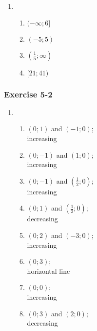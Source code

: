 {\begin{multicols}{3}
\begin{enumerate}[noitemsep, label=\textbf{\arabic*}. ]
\item %
\begin{enumerate}[noitemsep, label=\textbf{(\alph*)} ] 
 \item $(-\infty; 6]$ %
 \item $(-5; 5)$ %
 \item $(\frac{1}{5}; \infty)$%
 \item $[21; 41)$%
\end{enumerate}
\end{enumerate}

\subsubsection*{Exercise 5-2} %

\begin{enumerate}[noitemsep, label=\textbf{\arabic*}. ] 

\item %
      \begin{enumerate}[noitemsep, label=\textbf{(\alph*)} ] 
    \item $(0;1)$ and $(-1;0)$; \\increasing%
      \item $(0;-1)$ and $(1;0)$;\\ increasing%
      \item $(0;-1)$ and $(\frac{1}{2};0)$; \\increasing%
      \item $(0;1)$ and $(\frac{1}{3};0)$;\\ decreasing%
      \item $(0;2)$ and $(-3;0)$; \\increasing%
      \item $(0;3)$; \\horizontal line%
      \item $(0;0)$;\\ increasing%
      \item $(0;3)$ and $(2;0)$;\\ decreasing%
      \end{enumerate}



\end{enumerate}
\end{multicols}}
